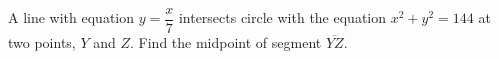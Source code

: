 A line with equation $y = \dfrac{x}{7}$ intersects circle with the equation $x^2 + y^2 = 144$ at two points, $Y$ and $Z$. Find the midpoint of segment $\overline{YZ}$.
